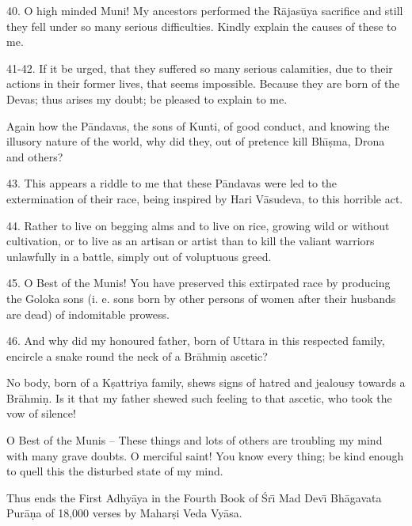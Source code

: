 40. O high minded Muni! My ancestors performed the R\=ajas\=uya sacrifice and still they fell under so many serious difficulties. Kindly explain the causes of these to me.

41-42. If it be urged, that they suffered so many serious calamities, due to their actions in their former lives, that seems impossible. Because they are born of the Devas; thus arises my doubt; be pleased to explain to me.

Again how the P\=andavas, the sons of Kunti, of good conduct, and knowing the illusory nature of the world, why did they, out of pretence kill Bh\={\i}\d{s}ma, Drona and others?

43. This appears a riddle to me that these P\=andavas were led to the extermination of their race, being inspired by Hari V\=asudeva, to this horrible act.

44. Rather to live on begging alms and to live on rice, growing wild or without cultivation, or to live as an artisan or artist than to kill the valiant warriors unlawfully in a battle, simply out of voluptuous greed.

45. O Best of the Munis! You have preserved this extirpated race by producing the Goloka sons (i. e. sons born by other persons of women after their husbands are dead) of indomitable prowess.

46. And why did my honoured father, born of Uttara in this respected family, encircle a snake round the neck of a Br\=ahmi\d{n} ascetic?

No body, born of a K\d{s}attriya family, shews signs of hatred and jealousy towards a Br\=ahmi\d{n}. Is it that my father shewed such feeling to that ascetic, who took the vow of silence!

O Best of the Munis -- These things and lots of others are troubling my mind with many grave doubts. O merciful saint! You know every thing; be kind enough to quell this the disturbed state of my mind.

Thus ends the First Adhy\=aya in the Fourth Book of \'Sr\={\i} Mad Dev\={\i} Bh\=agavata Pur\=a\d{n}a of 18,000 verses by Mahar\d{s}i Veda Vy\=asa.



